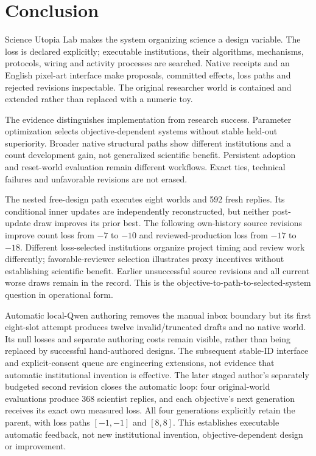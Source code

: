 \documentclass{article}
\begin{document}
\section{Conclusion}

Science Utopia Lab makes the system organizing science a design variable.
The loss is declared explicitly; executable institutions, their algorithms,
mechanisms, protocols, wiring and activity processes are searched. Native
receipts and an English pixel-art interface make proposals, committed effects,
loss paths and rejected revisions inspectable. The original researcher world
is contained and extended rather than replaced with a numeric toy.

The evidence distinguishes implementation from research success. Parameter
optimization selects objective-dependent systems without stable held-out
superiority. Broader native structural paths show different institutions and
a count development gain, not generalized scientific benefit. Persistent
adoption and reset-world evaluation remain different workflows. Exact ties,
technical failures and unfavorable revisions are not erased.

The nested free-design path executes eight worlds and 592 fresh replies.
Its conditional inner updates are independently reconstructed, but neither
post-update draw improves its prior best. The following own-history source
revisions improve count loss from $-7$ to $-10$ and reviewed-production loss
from $-17$ to $-18$. Different loss-selected institutions organize project
timing and review work differently; favorable-reviewer selection illustrates
proxy incentives without establishing scientific benefit. Earlier unsuccessful source
revisions and all current worse draws remain in the record.
This is the objective-to-path-to-selected-system question in operational form.

Automatic local-Qwen authoring removes the manual inbox boundary but its first
eight-slot attempt produces twelve invalid/truncated drafts and no native
world. Its null losses and separate authoring costs remain visible, rather
than being replaced by successful hand-authored designs. The subsequent
stable-ID interface and explicit-consent queue are engineering extensions,
not evidence that automatic institutional invention is effective.
The later staged author's separately budgeted second revision closes the
automatic loop: four original-world evaluations produce 368 scientist replies,
and each objective's next generation receives its exact own measured loss.
All four generations explicitly retain the parent, with loss paths
$[-1,-1]$ and $[8,8]$. This establishes executable automatic feedback, not
new institutional invention, objective-dependent design or improvement.
\end{document}
